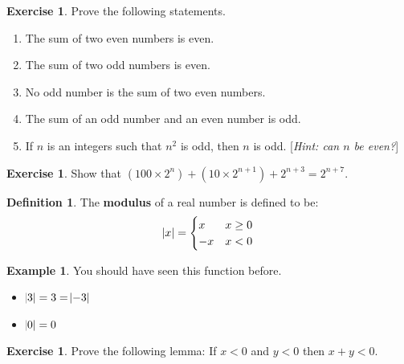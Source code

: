 \documentclass[a4paper]{amsart}
\theoremstyle{definition}
\newtheorem{defn}[thm]{Definition}
\newtheorem{ex}[thm]{Example}
\newtheorem{exercise}[thm]{Exercise}
\theoremstyle{remark}
\begin{document}
\begin{exercise}
  Prove the following statements.
  \begin{enumerate}
    \item The sum of two even numbers is even.
    \item The sum of two odd numbers is even.
    \item No odd number is the sum of two even numbers.
    \item The sum of an odd number and an even number is odd.
    \item If $ n $ is an integers such that $ n^2 $ is odd, then $ n $ is odd. [\textit{Hint: can $ n $ be even?}]
  \end{enumerate}
\end{exercise}

\begin{exercise}
  Show that $ (100 \times 2^n) + (10 \times 2^{n + 1}) + 2^{n + 3} = 2^{n + 7} $.
\end{exercise}

\begin{defn}
  The \textbf{modulus} of a real number is defined to be:
  \begin{displaymath}
    \abs{x} = \begin{cases}
                x & x \geq 0\\
                -x & x < 0
              \end{cases}
  \end{displaymath}
\end{defn}

\begin{ex}
  You should have seen this function before.

  \begin{itemize}
    \item $ \abs{3} = 3 = \abs{-3} $
    \item $ \abs{0} = 0 $
  \end{itemize}
\end{ex}

\begin{exercise}
  Prove the following lemma: If $ x < 0 $ and $ y < 0 $ then $ x + y < 0 $.
\end{exercise}
\end{document}
